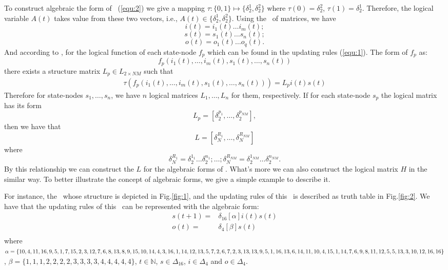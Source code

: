 To construct algebraic the form of \BCN\ (\ref{equ:2}) we give a mapping $\tau:\{0,1\}\mapsto \{\delta_2^1, \delta_2^2\}$ where $\tau(0)=\delta_2^2$, $\tau(1)= \delta_2^1$. 
Therefore, the logical variable $A(t)$ takes value from these two vectors, i.e., $A(t)\in \{\delta_2^1, \delta_2^2\}$. Using the \STP\ of matrices, we have 
\[i(t)=i_1(t){\ldots}i_m(t);\] 
\[s(t)=s_1(t){\ldots}s_n(t);\] 
\[o(t)=o_1(t){\ldots}o_q(t).\] 
And according to \cite{Cheng2003Semi}, for the logical function of each state-node $f_p$ which can be found in the updating rules (\ref{equ:1}). The form of  $f_p$ as:
\[f_p(i_1(t),\ldots,i_m(t),s_1(t),\ldots,s_n(t))\] 
there exists a structure matrix $L_p\in L_{2\times {NM}}$ such that
\begin{equation}
\begin{split}
\tau(f_p(i_1(t),\ldots,i_m(t),s_1(t),\ldots,s_n(t)))= L_pi(t)s(t)
\end{split}
\end{equation}
Therefore for state-nodes $s_1,\ldots,s_n$, we have $n$ logical matrices $L_1,\ldots,L_n$ for them, respectively. 
If for each state-node $s_p$ the logical matrix has its form
\[L_p=[\delta_2^{p_1},\ldots,\delta_2^{p_{NM}}],\] 
then we have that %
\[L=[\delta_N^{R_1},\ldots,\delta_N^{R_{NM}}]\]  where 
\[\delta_N^{R_1}=\delta_2^{1_1}\ldots\delta_2^{n_1};\ldots; \delta_N^{R_{NM}}=\delta_2^{1_{NM}}\ldots\delta_2^{n_{NM}}.\] 
By this relationship we can construct the $L$ for the algebraic forms of \BCNs. What's more we can also construct the logical matrix $H$ in the similar way. To better illustrate the concept of algebraic forms, we give a simple example to describe it.
\begin{example}
For instance, the \BCN\ whose structure is depicted in Fig.\ref{fig:1}, and the updating rules of this \BCN\ is described as truth table in Fig.\ref{fig:2}. We have that the updating rules of this \BCN\ can be represented with the algebraic form:
\begin{equation}
\begin{split}
s(t+1) =&\delta_{16}[\alpha]i(t)s(t)\\
o(t) =&\delta_4[\beta]s(t)\\
\end{split}
\label{equ:4}
\end{equation}
where $\alpha=\{10,4,11,16,9,5,1, 7,15,2,3,12,7,6,8,13,8,9,\\15,10,14,4,3,16,1,14,12,13,5,7,2,6,7,2,3,13,13,9,5,1,\\16,13 ,6,14,11,10,4,15,1,14 ,7,6,9 ,8,11,12,5,5,13,3,10,\\12,16,16\}$, $\beta=\{1,1,1,2,2,2,2,3,3,3,3,4,4,4,4,4\}$, $t\in \mathbb{N}$, $s\in \Delta_{16}$, $i\in \Delta_4$ and $o\in \Delta_4$.
\end{example}   
